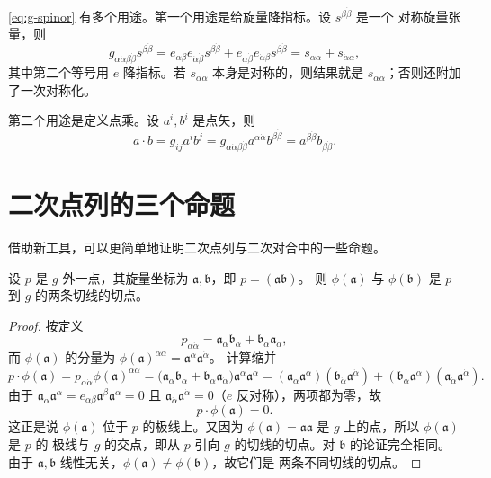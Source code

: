 \eqref{eq:g-spinor} 有多个用途。第一个用途是给旋量降指标。设 $s^{\beta\dot\beta}$ 是一个
对称旋量张量，则
\[
g_{\alpha\dot\alpha\beta\dot\beta}s^{\beta\dot\beta}
=e_{\alpha\beta}e_{\dot\alpha\dot\beta}s^{\beta\dot\beta}
+e_{\alpha\dot\beta}e_{\dot\alpha\beta}s^{\beta\dot\beta}
=s_{\alpha\dot\alpha}+s_{\dot\alpha\alpha},
\]
其中第二个等号用 $e$ 降指标。若 $s_{\alpha\dot\alpha}$ 本身是对称的，则结果就是
$s_{\alpha\dot\alpha}$；否则还附加了一次对称化。

第二个用途是定义点乘。设 $a^i,b^i$ 是点矢，则
\[
a\cdot b=g_{ij}a^ib^j
=g_{\alpha\dot\alpha\beta\dot\beta}a^{\alpha\dot\alpha}b^{\beta\dot\beta}
=a^{\beta\dot\beta}b_{\beta\dot\beta}.
\]

\section{二次点列的三个命题}

借助新工具，可以更简单地证明二次点列与二次对合中的一些命题。

\begin{proposition}\label{prop:tangent-points}
设 $p$ 是 $g$ 外一点，其旋量坐标为 $\mathfrak a,\mathfrak b$，即 $p=(\mathfrak a\mathfrak b)$。
则 $\phi(\mathfrak a)$ 与 $\phi(\mathfrak b)$ 是 $p$ 到 $g$ 的两条切线的切点。
\end{proposition}

\begin{proof}
按定义
\[
p_{\alpha\dot\alpha}=\mathfrak a_\alpha\mathfrak b_{\dot\alpha}
+\mathfrak b_\alpha\mathfrak a_{\dot\alpha},
\]
而 $\phi(\mathfrak a)$ 的分量为
$\phi(\mathfrak a)^{\alpha\dot\alpha}=\mathfrak a^\alpha\mathfrak a^{\dot\alpha}$。
计算缩并
\[
p\cdot\phi(\mathfrak a)
=p_{\alpha\dot\alpha}\phi(\mathfrak a)^{\alpha\dot\alpha}
=\bigl(\mathfrak a_\alpha\mathfrak b_{\dot\alpha}
+\mathfrak b_\alpha\mathfrak a_{\dot\alpha}\bigr)\mathfrak a^\alpha\mathfrak a^{\dot\alpha}
=(\mathfrak a_\alpha\mathfrak a^\alpha)(\mathfrak b_{\dot\alpha}\mathfrak a^{\dot\alpha})
+(\mathfrak b_\alpha\mathfrak a^\alpha)(\mathfrak a_{\dot\alpha}\mathfrak a^{\dot\alpha}).
\]
由于 $\mathfrak a_\alpha\mathfrak a^\alpha=e_{\alpha\beta}\mathfrak a^\beta\mathfrak a^\alpha=0$
且 $\mathfrak a_{\dot\alpha}\mathfrak a^{\dot\alpha}=0$（$e$ 反对称），两项都为零，故
\[
p\cdot\phi(\mathfrak a)=0 .
\]
这正是说 $\phi(\mathfrak a)$ 位于 $p$ 的极线上。又因为
$\phi(\mathfrak a)=\mathfrak a\mathfrak a$ 是 $g$ 上的点，所以 $\phi(\mathfrak a)$ 是 $p$ 的
极线与 $g$ 的交点，即从 $p$ 引向 $g$ 的切线的切点。对 $\mathfrak b$ 的论证完全相同。
由于 $\mathfrak a,\mathfrak b$ 线性无关，$\phi(\mathfrak a)\neq\phi(\mathfrak b)$，故它们是
两条不同切线的切点。
\end{proof}

